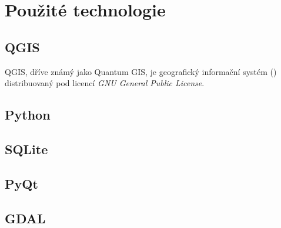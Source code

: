 \chapter{Použité technologie}
\label{3-technologie}

\section{QGIS}
\label{qgis}

QGIS, dříve známý jako Quantum GIS, je geografický informační systém () distribuovaný pod licencí \textit{GNU
General Public License}. 

\section{Python}
\label{python}


\section{SQLite}
\label{gdal}


\section{PyQt}
\label{pyqt}


\section{GDAL}
\label{gdal}

